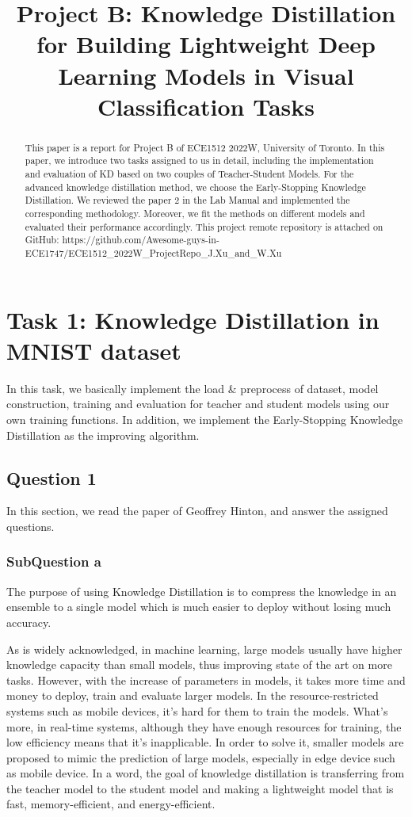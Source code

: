 \documentclass[conference]{IEEEtran}
\begin{document}
\title{Project B: Knowledge Distillation for Building Lightweight Deep Learning Models in Visual Classification Tasks
}
\maketitle

\begin{abstract}
  This paper is a report for Project B of ECE1512 2022W, University of Toronto.
  In this paper, we introduce two tasks assigned to us in detail, including the implementation and evaluation of KD based on two couples of Teacher-Student Models.
  For the advanced knowledge distillation method, we choose the Early-Stopping Knowledge Distillation. We reviewed the paper 2 in the Lab Manual and implemented the corresponding methodology. Moreover, we fit the methods on different models and evaluated their performance accordingly. This project remote repository is attached on GitHub: https://github.com/Awesome-guys-in-ECE1747/ECE1512\_2022W\_ProjectRepo\_J.Xu\_and\_W.Xu
  \end{abstract}
  
  \section{Task 1: Knowledge Distillation in MNIST dataset}
  In this task, we basically implement the load \& preprocess of dataset, model construction, training and evaluation for teacher and student models using our own training functions.
  In addition, we implement the Early-Stopping Knowledge Distillation as the improving algorithm.
  \subsection{Question 1}
  
  In this section, we read the paper of Geoffrey Hinton\cite{b6}, and answer the assigned questions.
  
  \subsubsection{SubQuestion a}
  The purpose of using Knowledge Distillation is to compress the knowledge in an ensemble to a single model which is much easier to deploy without losing much accuracy.\par
  As is widely acknowledged, in machine learning, large models usually have higher knowledge capacity than small models, thus improving state of the art on more tasks. 
  However, with the increase of parameters in models, it takes more time and money to deploy, train and evaluate larger models.
  In the resource-restricted systems such as mobile devices, it's hard for them to train the models. What's more, in real-time systems, although they have enough resources for training, the low efficiency means that it's inapplicable.
  In order to solve it, smaller models are proposed to mimic the prediction of large models, especially in edge device such as mobile device. In a word, the goal of knowledge distillation is transferring from the teacher model to the student model and making a lightweight model that is fast, memory-efficient, and energy-efficient.
  
\end{document}

